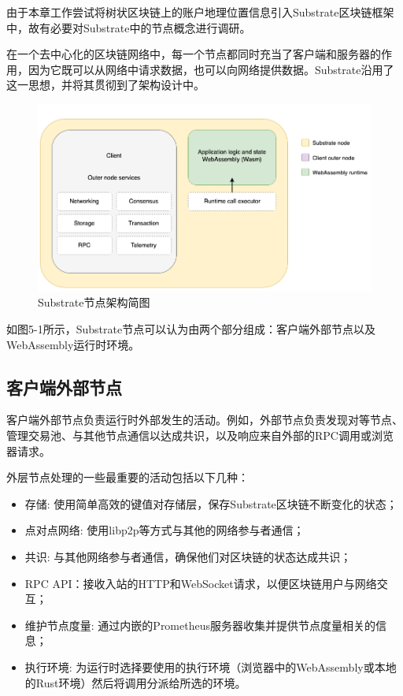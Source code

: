 由于本章工作尝试将树状区块链上的账户地理位置信息引入Substrate区块链框架中，故有必要对Substrate中的节点概念进行调研。

在一个去中心化的区块链网络中，每一个节点都同时充当了客户端和服务器的作用，因为它既可以从网络中请求数据，也可以向网络提供数据。Substrate沿用了这一思想，并将其贯彻到了架构设计中。

\begin{figure}[htbp]
    \centering
    \includegraphics[width=\textwidth]{images/simplified-architecture.png}
    \caption{Substrate节点架构简图}\label{Substrate节点架构简图} %
\end{figure}

如图5-1所示，Substrate节点可以认为由两个部分组成：客户端外部节点以及WebAssembly运行时环境。

\subsection{客户端外部节点}

客户端外部节点负责运行时外部发生的活动。例如，外部节点负责发现对等节点、管理交易池、与其他节点通信以达成共识，以及响应来自外部的RPC调用或浏览器请求。

外层节点处理的一些最重要的活动包括以下几种：

\begin{itemize}
    \item 存储: 使用简单高效的键值对存储层，保存Substrate区块链不断变化的状态；
    \item 点对点网络: 使用libp2p等方式与其他的网络参与者通信；
    \item 共识: 与其他网络参与者通信，确保他们对区块链的状态达成共识；
    \item RPC API：接收入站的HTTP和WebSocket请求，以便区块链用户与网络交互；
    \item 维护节点度量: 通过内嵌的Prometheus服务器收集并提供节点度量相关的信息；
    \item 执行环境: 为运行时选择要使用的执行环境（浏览器中的WebAssembly或本地的Rust环境）然后将调用分派给所选的环境。
\end{itemize}


